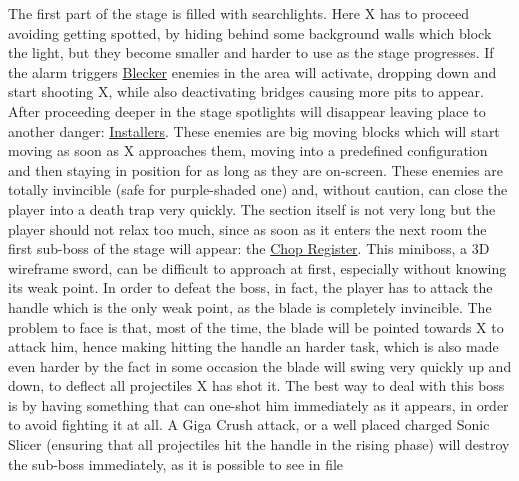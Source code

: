 The first part of the stage is filled with searchlights. Here X has to proceed avoiding getting spotted, by hiding behind some background walls which block the light, but they become smaller and harder to use as the stage progresses. If the alarm triggers \hyperlink{enem:Blecker}{Blecker} enemies in the area will activate, dropping down and start shooting X, while also deactivating bridges causing more pits to appear. After proceeding deeper in the stage spotlights will disappear leaving place to another danger: \hyperlink{enem:Installer}{Installers}. These enemies are big moving blocks which will start moving as soon as X approaches them, moving into a predefined configuration and then staying in position for as long as they are on-screen. These enemies are totally invincible (safe for purple-shaded one) and, without caution, can close the player into a death trap very quickly. The section itself is not very long but the player should not relax too much, since as soon as it enters the next room the first sub-boss of the stage will appear: the \hyperlink{miniboss:Chop_Register}{Chop Register}. This miniboss, a 3D wireframe sword, can be difficult to approach at first, especially without knowing its weak point. In order to defeat the boss, in fact, the player has to attack the handle which is the only weak point, as the blade is completely invincible. The problem to face is that, most of the time, the blade will be pointed towards X to attack him, hence making hitting the handle an harder task, which is also made even harder by the fact in some occasion the blade will swing very quickly up and down, to deflect all projectiles X has shot it. The best way to deal with this boss is by having something that can one-shot him immediately as it appears, in order to avoid fighting it at all. A Giga Crush attack, or a well placed charged Sonic Slicer (ensuring that all projectiles hit the handle in the rising phase) will destroy the sub-boss immediately, as it is possible to see in file 

